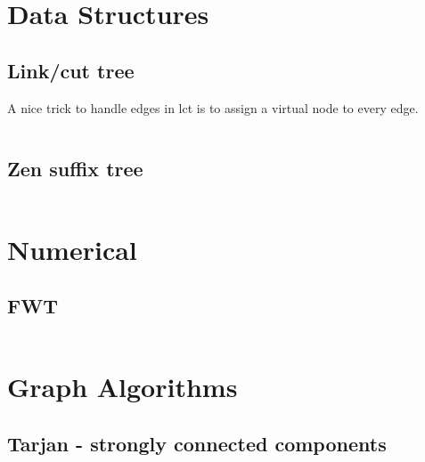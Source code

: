 \documentclass[portrait, 8pt, a4paper, oneside, landscape]{extarticle}
\begin{document}
\thispagestyle{empty}

% 
\begin{multicols}{3}

\section{Data Structures}
\subsection{Link/cut tree}
A nice trick to handle edges in lct is to assign a virtual node to every edge.
\inputminted{cpp}{src/lct.cpp}
\subsection{Zen suffix tree}
\inputminted{cpp}{src/suffixTree.cpp}

\section{Numerical}
\subsection{FWT}
\inputminted{cpp}{src/fwt.cpp}


\section{Graph Algorithms}

\subsection{Tarjan - strongly connected components}
\inputminted{cpp}{src/scc.cpp}


\end{multicols}
\end{document}
